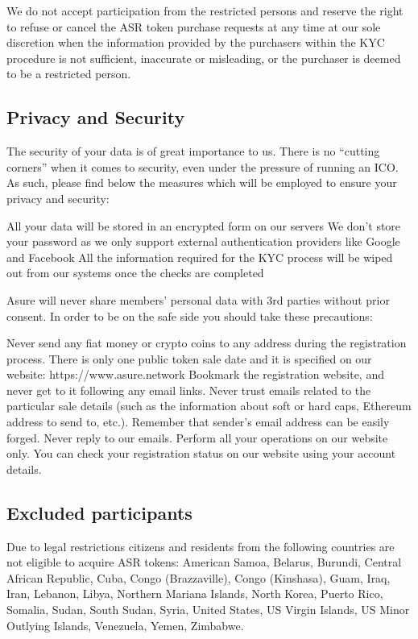 We do not accept participation from the restricted persons and reserve the right to refuse or cancel the ASR token purchase requests at any time at our sole discretion when the information provided by the purchasers within the KYC procedure is not sufficient, inaccurate or misleading, or the purchaser is deemed to be a restricted person.

\subsection{Privacy and Security}
The security of your data is of great importance to us. There is no “cutting corners” when it comes to security, even under the pressure of running an ICO.  As such, please find below the measures which will be employed to ensure your privacy and security: 

All your data will be stored in an encrypted form on our servers
We don’t store your password as we only support external authentication providers like Google and Facebook
All the information required for the KYC process will be wiped out from our systems once the checks are completed

Asure will never share members’ personal data with 3rd parties without prior consent. In order to be on the safe side you should take these precautions: 

Never send any fiat money or crypto coins to any address during the registration process. There is only one public token sale date and it is specified on our 
website: https://www.asure.network
Bookmark the registration website, and never get to it following any email links.
Never trust emails related to the particular sale details (such as the information about soft or hard caps, Ethereum address to send to, etc.). Remember that sender’s email address can be easily forged. 
Never reply to our emails. Perform all your operations on our website only. You can check your registration status on our website using your account details. 


\subsection{Excluded participants}
Due to legal restrictions citizens and residents from the following countries are not eligible to acquire ASR tokens: American Samoa, Belarus, Burundi, Central African Republic, Cuba, Congo (Brazzaville), Congo (Kinshasa), Guam, Iraq, Iran, Lebanon, Libya, Northern Mariana Islands, North Korea, Puerto Rico, Somalia, Sudan, South Sudan, Syria, United States, US Virgin Islands, US Minor Outlying Islands, Venezuela, Yemen, Zimbabwe.
